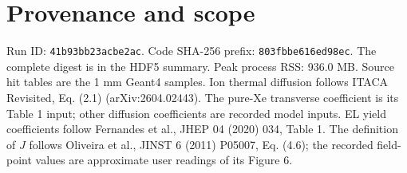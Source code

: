 \documentclass[11pt]{article}
\begin{document}
\section*{Provenance and scope}
Run ID: \texttt{41b93bb23acbe2ac}. Code SHA-256 prefix: \texttt{803fbbe616ed98ec}. The complete digest is in the HDF5 summary.
Peak process RSS: 936.0 MB. Source hit tables are the 1 mm Geant4 samples.
Ion thermal diffusion follows ITACA Revisited, Eq. (2.1) (arXiv:2604.02443). The pure-Xe transverse coefficient is its Table 1 input; other diffusion coefficients are recorded model inputs. EL yield coefficients follow Fernandes et al., JHEP 04 (2020) 034, Table 1. The definition of $J$ follows Oliveira et al., JINST 6 (2011) P05007, Eq. (4.6); the recorded field-point values are approximate user readings of its Figure 6.
\end{document}
